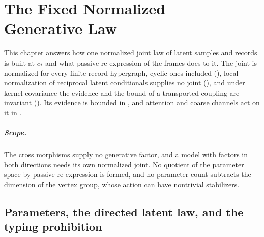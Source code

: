 \chapter[The Fixed Normalized Generative Law]{The Fixed Normalized\\Generative Law}
\label{ch:generative}

This chapter answers how one normalized joint law of latent samples and records is built at $c_*$ and
what passive re-expression of the frames does to it. The joint is normalized for every finite record
hypergraph, cyclic ones included (), local normalization of
reciprocal latent conditionals supplies no joint (), and under
kernel covariance the evidence and the bound of a transported coupling are invariant
(). Its evidence is
bounded in , and attention and coarse channels act on it in
.

\paragraph{Scope.}
The cross morphisms supply no generative factor, and a model with factors in both directions needs its
own normalized joint. No quotient of the parameter space by passive re-expression is formed, and
no parameter count subtracts the dimension of the vertex group, whose action can have nontrivial
stabilizers. 

\section{Parameters, the directed latent law, and the typing prohibition}
\label{sec:gen-typing-setup}
\label{sec:gen-composition}
\label{sec:gen-typing}


